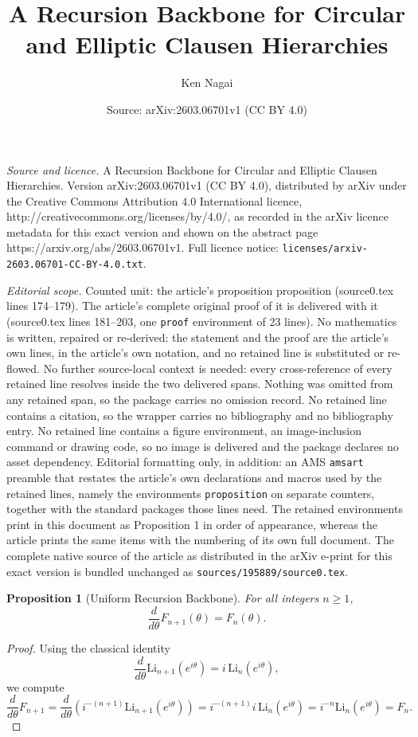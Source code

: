 \documentclass[10pt,a4paper]{amsart}
\title{A Recursion Backbone for Circular and Elliptic Clausen Hierarchies}
\author{Ken Nagai}
\date{Source: arXiv:2603.06701v1 (CC BY 4.0)}
\newtheorem{proposition}{Proposition}
\begin{document}
\maketitle

\noindent\emph{Source and licence.} A Recursion Backbone for Circular and Elliptic Clausen Hierarchies. Version arXiv:2603.06701v1 (CC BY 4.0), distributed by arXiv under the Creative Commons Attribution 4.0 International licence, http://creativecommons.org/licenses/by/4.0/, as recorded in the arXiv licence metadata for this exact version and shown on the abstract page https://arxiv.org/abs/2603.06701v1. Full licence notice: \texttt{licenses/arxiv-2603.06701-CC-BY-4.0.txt}.\par\smallskip

\noindent\textit{Editorial scope.} Counted unit: the article's proposition proposition (source0.tex lines 174--179). The article's complete original proof of it is delivered with it (source0.tex lines 181--203, one \texttt{proof} environment of 23 lines). No mathematics is written, repaired or re-derived: the statement and the proof are the article's own lines, in the article's own notation, and no retained line is substituted or re-flowed.  No further source-local context is needed: every cross-reference of every retained line resolves inside the two delivered spans.  Nothing was omitted from any retained span, so the package carries no omission record.  No retained line contains a citation, so the wrapper carries no bibliography and no bibliography entry.  No retained line contains a figure environment, an image-inclusion command or drawing code, so no image is delivered and the package declares no asset dependency.  Editorial formatting only, in addition: an AMS \texttt{amsart} preamble that restates the article's own declarations and macros used by the retained lines, namely the environments \texttt{proposition} on separate counters, together with the standard packages those lines need.  The retained environments print in this document as Proposition 1 in order of appearance, whereas the article prints the same items with the numbering of its own full document.  The complete native source of the article as distributed in the arXiv e-print for this exact version is bundled unchanged as \texttt{sources/195889/source0.tex}.
\begin{proposition}[Uniform Recursion Backbone]
For all integers $n\ge1$,
\[
\frac{d}{d\theta}F_{n+1}(\theta)=F_n(\theta).
\]
\end{proposition}

\begin{proof}
Using the classical identity
\[
\frac{d}{d\theta}\mathrm{Li}_{n+1}(e^{i\theta})
=
i\,\mathrm{Li}_n(e^{i\theta}),
\]
we compute
\[
\frac{d}{d\theta}F_{n+1}
=
\frac{d}{d\theta}
\left(
i^{-(n+1)}\mathrm{Li}_{n+1}(e^{i\theta})
\right)
=
i^{-(n+1)} i\,\mathrm{Li}_n(e^{i\theta})
=
i^{-n}\mathrm{Li}_n(e^{i\theta})
=
F_n.
\]
\end{proof}
\end{document}
